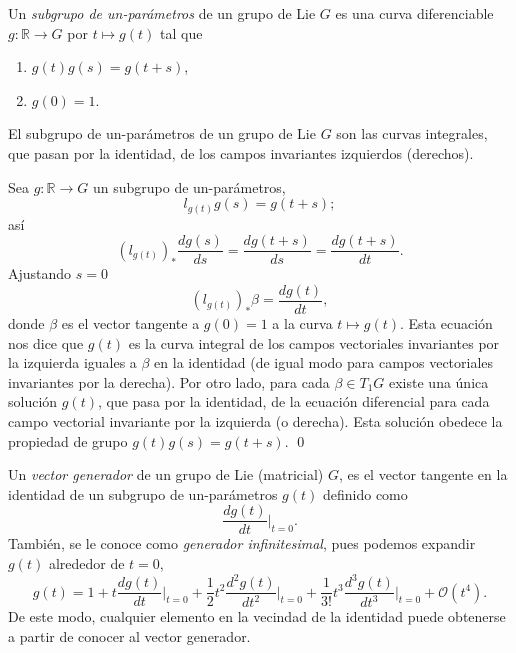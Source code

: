 \begin{mydef}
Un \emph{subgrupo de un-par\'{a}metros} de un grupo de Lie $G$ es una curva diferenciable $g: \mathbb{R} \rightarrow G$ por $t \mapsto g (t)$ tal que
%
\begin{enumerate}
\item{$g (t) g (s) = g (t + s)$,}
\item{$g (0) = 1$.}
\end{enumerate}
%
\end{mydef}

\begin{thm}
El subgrupo de un-par\'{a}metros de un grupo de Lie $G$ son las curvas integrales, que pasan por la identidad, de los campos invariantes izquierdos (derechos).
\end{thm}

\begin{dem}
Sea $g: \mathbb{R} \rightarrow G$ un subgrupo de un-par\'{a}metros, $$l_{g(t)} g(s) = g(t + s);$$ as\'{i} $$(l_{g(t)})_{*} \frac{d g(s)}{d s} = \frac{d g(t +s )}{d s} = \frac{d g(t + s)}{d t}.$$ Ajustando $s = 0$ $$(l_{g(t)})_{*} \beta = \frac{d g(t)}{d t},$$ donde $\beta$ es el vector tangente a $g (0) = 1$ a la curva $t \mapsto g (t)$. Esta ecuaci\'{o}n nos dice que $g (t)$ es la curva integral de los campos vectoriales invariantes por la izquierda iguales a $\beta$ en la identidad (de igual modo para campos vectoriales invariantes por la derecha). Por otro lado, para cada $\beta \in T_{1} G$ existe una \'{u}nica soluci\'{o}n $g (t)$, que pasa por la identidad, de la ecuaci\'{o}n diferencial para cada campo vectorial invariante por la izquierda (o derecha). Esta soluci\'{o}n obedece la propiedad de grupo $g (t) g (s) = g (t + s)$. \qed
\end{dem}

\begin{mydef}
Un \emph{vector generador} de un grupo de Lie (matricial) $G$, es el vector tangente en la identidad de un subgrupo de un-par\'{a}metros $g (t)$ definido como
%
\begin{equation}
\frac{d g (t)}{dt} \bigg\vert_{t=0}.
\end{equation}
%
Tambi\'{e}n, se le conoce como \emph{generador infinitesimal}, pues podemos expandir $g (t)$ alrededor de $t=0$, $$g (t) = 1 + t \frac{d g (t)}{dt} \bigg\vert_{t=0} + \frac{1}{2}  t^{2} \frac{d^{2} g (t)}{dt^{2}} \bigg\vert_{t=0} + \frac{1}{3 !} t^{3} \frac{d^{3} g (t)}{dt^{3}} \bigg\vert_{t=0} + \mathcal{O} (t^{4}).$$ De este modo, cualquier elemento en la vecindad de la identidad puede obtenerse a partir de conocer al vector generador.
\end{mydef}

